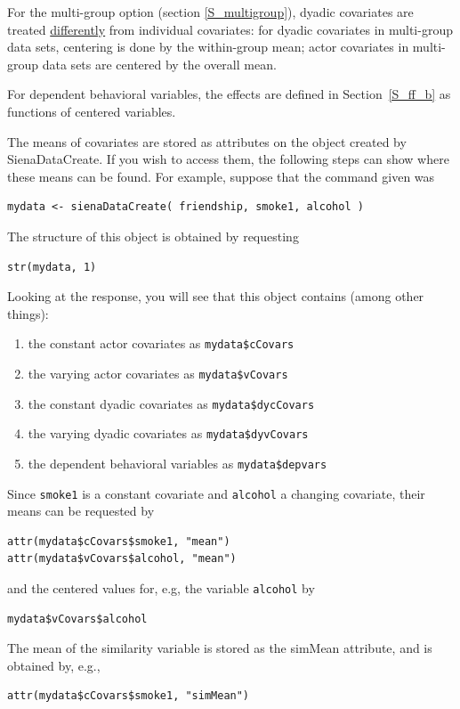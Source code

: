 \documentclass[a4paper,fleqn,11pt]{article}
\newcommand{\+}{\, + \,}
\newcommand{\sfn}[1]{\textsf{#1}}
\begin{document}
For the multi-group option (section \ref{S_multigroup}),
dyadic covariates are treated \underline{differently} from
individual covariates:
for dyadic covariates in multi-group data sets, centering is done by the
within-group mean;
actor covariates in multi-group data sets
are centered by the overall mean.

For dependent behavioral variables, the effects are defined
in Section~\ref{S_ff_b} as functions of centered variables.

The means of covariates are stored as attributes on the object created by
\sfn{SienaDataCreate}.
If you wish to access them, the following steps can show
where these means can be found.
For example, suppose that the command given was
\begin{verbatim}
mydata <- sienaDataCreate( friendship, smoke1, alcohol )
\end{verbatim}
The structure of this object is obtained by requesting
\begin{verbatim}
str(mydata, 1)
\end{verbatim}
Looking at the response, you
will see that this object contains (among other things):
\begin{enumerate}
\item the constant actor covariates as \texttt{mydata\$cCovars}
\item the varying actor covariates as \texttt{mydata\$vCovars}
\item the constant dyadic covariates as \texttt{mydata\$dycCovars}
\item the varying dyadic covariates as \texttt{mydata\$dyvCovars}
\item the dependent behavioral variables as \texttt{mydata\$depvars}
\end{enumerate}
Since \texttt{smoke1} is a constant covariate and \texttt{alcohol}
a changing covariate, their means can be requested by
\begin{verbatim}
attr(mydata$cCovars$smoke1, "mean")
attr(mydata$vCovars$alcohol, "mean")
\end{verbatim}
and the centered values for, e.g, the variable \texttt{alcohol} by
\begin{verbatim}
mydata$vCovars$alcohol
\end{verbatim}
The mean of the similarity variable is stored as the \sfn{simMean} attribute,
and is obtained by, e.g.,
\begin{verbatim}
attr(mydata$cCovars$smoke1, "simMean")
\end{verbatim}
\end{document}
